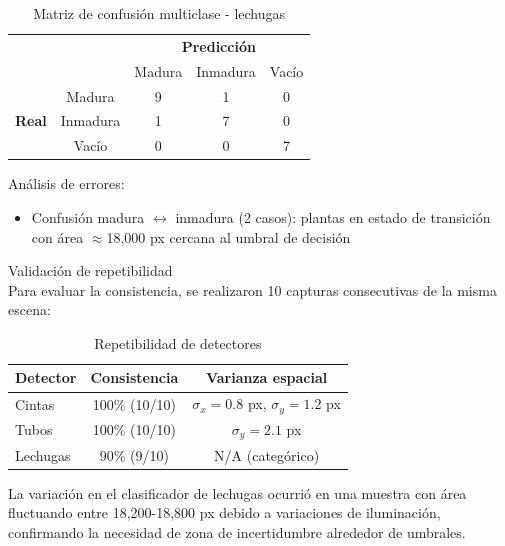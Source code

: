 \begin{table}[H]
\centering
\begin{tabular}{cc|c|c|c|}
\cline{3-5}
& & \multicolumn{3}{c|}{\textbf{Predicción}} \\ \cline{3-5}
& & Madura & Inmadura & Vacío \\ \hline
\multicolumn{1}{|c|}{\multirow{3}{*}{\textbf{Real}}} & Madura & 9 & 1 & 0 \\ \cline{2-5}
\multicolumn{1}{|c|}{} & Inmadura & 1 & 7 & 0 \\ \cline{2-5}
\multicolumn{1}{|c|}{} & Vacío & 0 & 0 & 7 \\ \hline
\end{tabular}
\caption{Matriz de confusión multiclase - lechugas}
\label{tab:confusion_lechugas}
\end{table}

\noindent
Análisis de errores:
\begin{itemize}
        \item Confusión madura $\leftrightarrow$ inmadura (2 casos): plantas en estado de transición con área $\approx$18,000 px cercana al umbral de decisión
    \end{itemize}


Validación de repetibilidad\\
\noindent
Para evaluar la consistencia, se realizaron 10 capturas consecutivas de la misma escena:

\begin{table}[H]
\centering
\begin{tabular}{|l|c|c|}
\hline
\textbf{Detector} & \textbf{Consistencia} & \textbf{Varianza espacial} \\ \hline
Cintas & 100\% (10/10) & $\sigma_x = 0.8$ px, $\sigma_y = 1.2$ px \\ \hline
Tubos & 100\% (10/10) & $\sigma_y = 2.1$ px \\ \hline
Lechugas & 90\% (9/10) & N/A (categórico) \\ \hline
\end{tabular}
\caption{Repetibilidad de detectores}
\label{tab:repetibilidad}
\end{table}

\noindent
La variación en el clasificador de lechugas ocurrió en una muestra con área fluctuando entre 18,200-18,800 px debido a variaciones de iluminación, confirmando la necesidad de zona de incertidumbre alrededor de umbrales.


